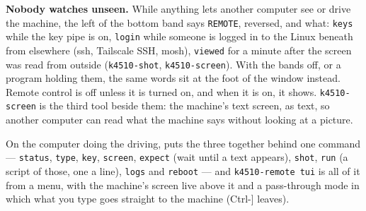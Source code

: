 \textbf{Nobody watches unseen.} While anything lets another computer see
or drive the machine, the left of the bottom band says \texttt{REMOTE},
reversed, and what: \texttt{keys} while the key pipe is on,
\texttt{login} while someone is logged in to the Linux beneath from
elsewhere (ssh, Tailscale SSH, mosh), \texttt{viewed} for a minute after
the screen was read from outside (\verb|k4510-shot|, \verb|k4510-screen|).
With the bands off, or a program holding them, the same words sit at the
foot of the window instead. Remote control is off unless it is turned on,
and when it is on, it shows. \verb|k4510-screen| is the third tool beside them:
the machine's text screen, as text, so another computer can read what
the machine says without looking at a picture.

On the computer doing the driving,  puts the
three together behind one command --- \verb|status|, \verb|type|,
\verb|key|, \verb|screen|, \verb|expect| (wait until a text appears),
\verb|shot|, \verb|run| (a script of those, one a line), \verb|logs| and
\verb|reboot| --- and \verb|k4510-remote tui| is all of it from a menu,
with the machine's screen live above it and a pass-through mode in which
what you type goes straight to the machine (Ctrl-] leaves).
